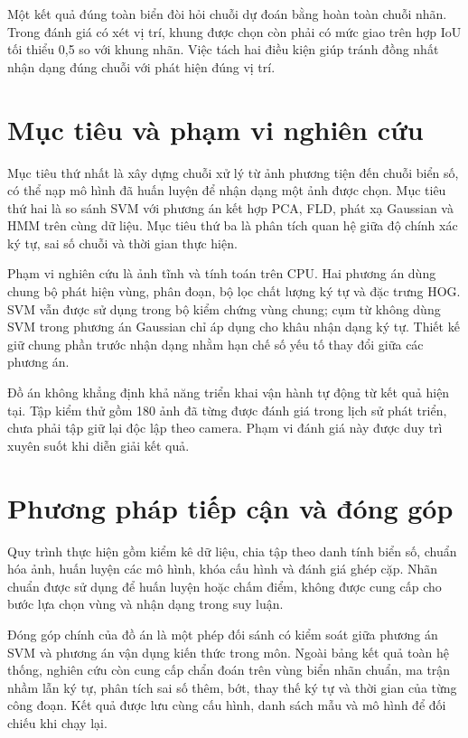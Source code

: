 Một kết quả đúng toàn biển đòi hỏi chuỗi dự đoán bằng hoàn toàn chuỗi nhãn. Trong đánh giá có xét vị trí, khung được chọn còn phải có mức giao trên hợp IoU tối thiểu 0,5 so với khung nhãn. Việc tách hai điều kiện giúp tránh đồng nhất nhận dạng đúng chuỗi với phát hiện đúng vị trí.

\section{Mục tiêu và phạm vi nghiên cứu}
Mục tiêu thứ nhất là xây dựng chuỗi xử lý từ ảnh phương tiện đến chuỗi biển số, có thể nạp mô hình đã huấn luyện để nhận dạng một ảnh được chọn. Mục tiêu thứ hai là so sánh SVM với phương án kết hợp PCA, FLD, phát xạ Gaussian và HMM trên cùng dữ liệu. Mục tiêu thứ ba là phân tích quan hệ giữa độ chính xác ký tự, sai số chuỗi và thời gian thực hiện.

Phạm vi nghiên cứu là ảnh tĩnh và tính toán trên CPU. Hai phương án dùng chung bộ phát hiện vùng, phân đoạn, bộ lọc chất lượng ký tự và đặc trưng HOG. SVM vẫn được sử dụng trong bộ kiểm chứng vùng chung; cụm từ không dùng SVM trong phương án Gaussian chỉ áp dụng cho khâu nhận dạng ký tự. Thiết kế giữ chung phần trước nhận dạng nhằm hạn chế số yếu tố thay đổi giữa các phương án.

Đồ án không khẳng định khả năng triển khai vận hành tự động từ kết quả hiện tại. Tập kiểm thử gồm 180 ảnh đã từng được đánh giá trong lịch sử phát triển, chưa phải tập giữ lại độc lập theo camera. Phạm vi đánh giá này được duy trì xuyên suốt khi diễn giải kết quả.

\section{Phương pháp tiếp cận và đóng góp}
Quy trình thực hiện gồm kiểm kê dữ liệu, chia tập theo danh tính biển số, chuẩn hóa ảnh, huấn luyện các mô hình, khóa cấu hình và đánh giá ghép cặp. Nhãn chuẩn được sử dụng để huấn luyện hoặc chấm điểm, không được cung cấp cho bước lựa chọn vùng và nhận dạng trong suy luận.

Đóng góp chính của đồ án là một phép đối sánh có kiểm soát giữa phương án SVM và phương án vận dụng kiến thức trong môn. Ngoài bảng kết quả toàn hệ thống, nghiên cứu còn cung cấp chẩn đoán trên vùng biển nhãn chuẩn, ma trận nhầm lẫn ký tự, phân tích sai số thêm, bớt, thay thế ký tự và thời gian của từng công đoạn. Kết quả được lưu cùng cấu hình, danh sách mẫu và mô hình để đối chiếu khi chạy lại.
